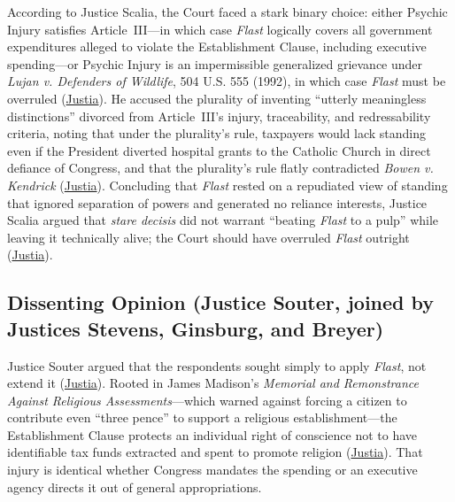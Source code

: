 \documentclass[12pt]{article}
\begin{document}
According to Justice Scalia, the Court faced a stark binary choice: either Psychic Injury satisfies Article~III---in which case \textit{Flast} logically covers all government expenditures alleged to violate the Establishment Clause, including executive spending---or Psychic Injury is an impermissible generalized grievance under \textit{Lujan v. Defenders of Wildlife}, 504 U.S. 555 (1992), in which case \textit{Flast} must be overruled (\href{https://supreme.justia.com/cases/federal/us/551/587/}{Justia}). He accused the plurality of inventing ``utterly meaningless distinctions'' divorced from Article~III's injury, traceability, and redressability criteria, noting that under the plurality's rule, taxpayers would lack standing even if the President diverted hospital grants to the Catholic Church in direct defiance of Congress, and that the plurality's rule flatly contradicted \textit{Bowen v. Kendrick} (\href{https://supreme.justia.com/cases/federal/us/551/587/}{Justia}). Concluding that \textit{Flast} rested on a repudiated view of standing that ignored separation of powers and generated no reliance interests, Justice Scalia argued that \textit{stare decisis} did not warrant ``beating \textit{Flast} to a pulp'' while leaving it technically alive; the Court should have overruled \textit{Flast} outright (\href{https://supreme.justia.com/cases/federal/us/551/587/}{Justia}).

\subsection{Dissenting Opinion (Justice Souter, joined by Justices Stevens, Ginsburg, and Breyer)}

Justice Souter argued that the respondents sought simply to apply \textit{Flast}, not extend it (\href{https://supreme.justia.com/cases/federal/us/551/587/}{Justia}). Rooted in James Madison's \textit{Memorial and Remonstrance Against Religious Assessments}---which warned against forcing a citizen to contribute even ``three pence'' to support a religious establishment---the Establishment Clause protects an individual right of conscience not to have identifiable tax funds extracted and spent to promote religion (\href{https://supreme.justia.com/cases/federal/us/551/587/}{Justia}). That injury is identical whether Congress mandates the spending or an executive agency directs it out of general appropriations.
\end{document}
